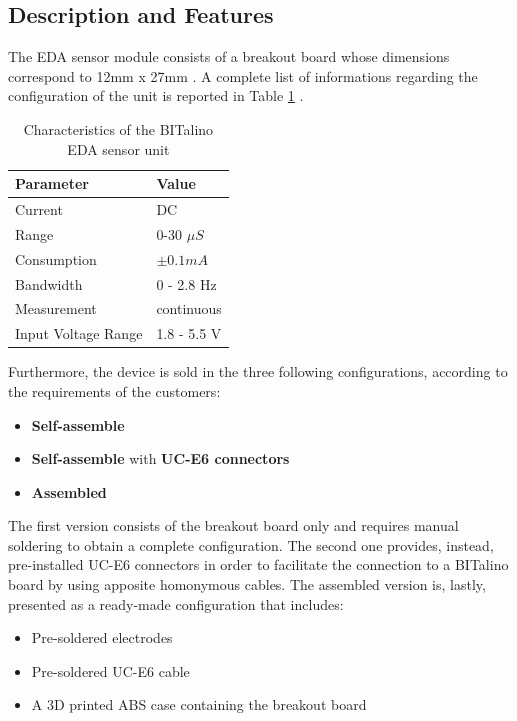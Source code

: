 \subsection{Description and Features}\label{subsec:bitalino-features}

The EDA sensor module consists of a breakout board whose dimensions correspond to 12mm x 27mm \cite{bitalino-general}. A complete list of informations regarding the configuration of the unit is reported in Table \ref{toc:bitalino-features} .

\begin{table}[H]
\centering
\begin{tabular}{ll}
    \hline
    Parameter               & Value \\
    \hline
    Current                 & DC \\
    Range                   & 0-30 $\mu S$ \\
    Consumption             & $\pm 0.1 mA$ \\
    Bandwidth               & 0 - 2.8 Hz \\
    Measurement             & continuous \\
    Input Voltage Range     & 1.8 - 5.5 V \\
    \hline
\end{tabular}
\caption{Characteristics of the BITalino EDA sensor unit}
\label{toc:bitalino-features}
\end{table}

Furthermore, the device is sold in the three following configurations, according to the requirements of the customers: 
\begin{itemize}
    \item \textbf{Self-assemble}
    \item \textbf{Self-assemble} with \textbf{UC-E6 connectors}
    \item \textbf{Assembled}
\end{itemize}

\vspace{3mm}

The first version consists of the breakout board only and requires manual soldering to obtain a complete configuration. The second one provides, instead, pre-installed UC-E6 connectors in order to facilitate the connection to a BITalino board by using apposite homonymous cables. The assembled version is, lastly, presented as a ready-made configuration that includes: 

\begin{itemize}
    \item Pre-soldered electrodes
    \item Pre-soldered UC-E6 cable
    \item A 3D printed ABS case containing the breakout board
\end{itemize}

